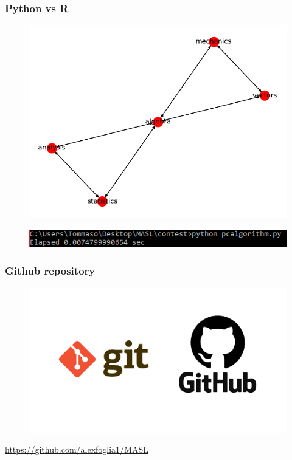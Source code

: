 \documentclass[xcolor ={table,usenames,dvipsnames}]{beamer}
\theoremstyle{definition}
\begin{document}
\begin{frame}
\frametitle{Python vs R}
\begin{figure}[h!]
	\centering
	\includegraphics[scale=0.4]{img/pydag}
\end{figure}
\begin{figure}[h!]
	\centering
	\includegraphics[scale=0.8]{img/pytime}
\end{figure}
\end{frame}

\begin{frame}
	\frametitle{Github repository}
	\begin{figure}[h!]
		\centering
		\includegraphics[scale=0.15]{img/github.PNG}
	\end{figure}
	\begin{center}
		\color{blue}\href{https://github.com/alexfoglia1/MASL}{https://github.com/alexfoglia1/MASL}
	\end{center} 
\end{frame}
\end{document}
